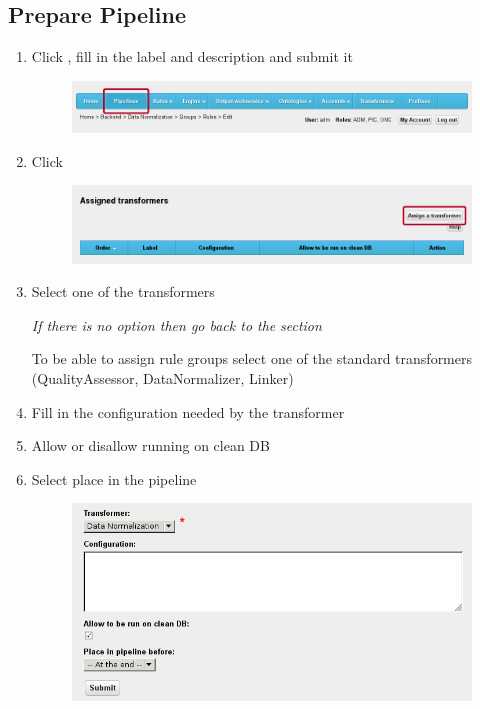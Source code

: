   
\subsection*{Prepare Pipeline}
\begin{enumerate}[resume]
	\item Click , fill in the label and description and submit it

\begin{figure}[!h]
    \centering
    \includegraphics[width=\textwidth]{images/fe-walkthrough-menu-pipelines.png}
	\label{fig:feWTMenuPipelines}
\end{figure}

	\item Click 

\begin{figure}[!h]
    \centering
    \includegraphics[width=\textwidth]{images/fe-walkthrough-assign-transformer.png}
	\label{fig:feWTAssignTransformer}
\end{figure}

	\item Select one of the transformers
	
	\emph{If there is no option then go back to the} \textbf{} \emph{section}
	
	To be able to assign rule groups select one of the standard transformers (QualityAssessor, DataNormalizer, Linker)

	\item Fill in the configuration needed by the transformer
	\item Allow or disallow running on clean DB
	\item Select place in the pipeline

\begin{figure}[!h]
    \centering
    \includegraphics[width=\textwidth]{images/fe-walkthrough-new-transformer-assignment.png}
	\label{fig:feWTNewTransformerAssignment}
\end{figure}


\end{enumerate}
